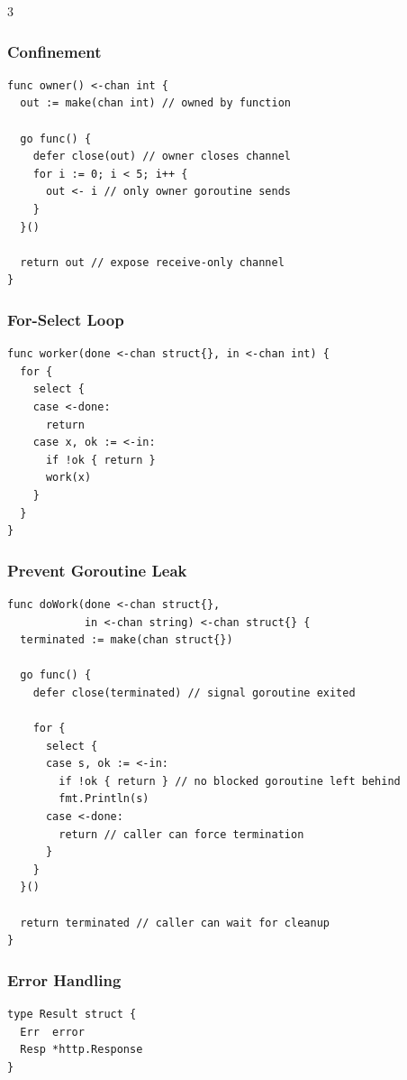 \documentclass[12pt, a4paper]{article}
\begin{document}
\begin{multicols*}{3}
\subsubsection{Confinement}
\begin{lstlisting}[basicstyle=\ttfamily\scriptsize]
func owner() <-chan int {
  out := make(chan int) // owned by function

  go func() {
    defer close(out) // owner closes channel
    for i := 0; i < 5; i++ {
      out <- i // only owner goroutine sends
    }
  }()

  return out // expose receive-only channel
}
\end{lstlisting}

\subsubsection{For-Select Loop}
\begin{lstlisting}[basicstyle=\ttfamily\scriptsize]
func worker(done <-chan struct{}, in <-chan int) {
  for {
    select {
    case <-done:
      return
    case x, ok := <-in:
      if !ok { return }
      work(x)
    }
  }
}
\end{lstlisting}

\subsubsection{Prevent Goroutine Leak}
\begin{lstlisting}[basicstyle=\ttfamily\scriptsize]
func doWork(done <-chan struct{},
            in <-chan string) <-chan struct{} {
  terminated := make(chan struct{})

  go func() {
    defer close(terminated) // signal goroutine exited

    for {
      select {
      case s, ok := <-in: 
        if !ok { return } // no blocked goroutine left behind
        fmt.Println(s)
      case <-done:
        return // caller can force termination
      }
    }
  }()

  return terminated // caller can wait for cleanup
}
\end{lstlisting}
\colbreak

\subsubsection{Error Handling}
\begin{lstlisting}[basicstyle=\ttfamily\scriptsize]
type Result struct {
  Err  error
  Resp *http.Response
}


\end{lstlisting}
\end{multicols*}
\end{document}
